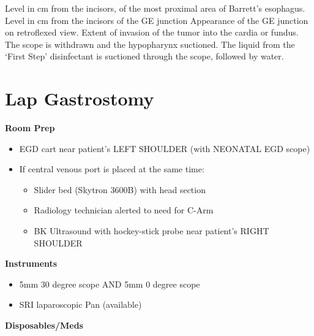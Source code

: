 \documentclass[
]{book}
\providecommand{\tightlist}{%
  \setlength{\itemsep}{0pt}\setlength{\parskip}{0pt}}
\begin{document}
Level in cm from the incisors, of the most proximal area of Barrett's esophagus.
Level in cm from the incisors of the GE junction
Appearance of the GE junction on retroflexed view. Extent of invasion of the tumor into the cardia or fundus.
The scope is withdrawn and the hypopharynx suctioned. The liquid from the `First Step' disinfectant is suctioned through the scope, followed by water.

\hypertarget{lap_gastrostomy_salo}{%
\chapter{Lap Gastrostomy}\label{lap_gastrostomy_salo}}

\textbf{Room Prep}

\begin{itemize}
\tightlist
\item
  EGD cart near patient's LEFT SHOULDER (with NEONATAL EGD scope)
\item
  If central venous port is placed at the same time:

  \begin{itemize}
  \tightlist
  \item
    Slider bed (Skytron 3600B) with head section
  \item
    Radiology technician alerted to need for C-Arm
  \item
    BK Ultrasound with hockey-stick probe near patient's RIGHT SHOULDER
  \end{itemize}
\end{itemize}

\textbf{Instruments}

\begin{itemize}
\tightlist
\item
  5mm 30 degree scope AND 5mm 0 degree scope
\item
  SRI laparoscopic Pan (available)
\end{itemize}

\textbf{Disposables/Meds}
\end{document}
